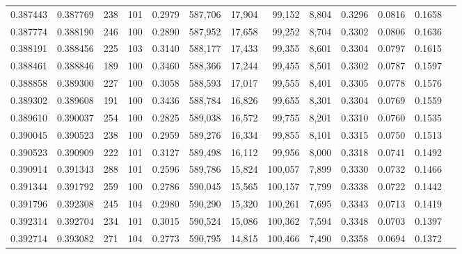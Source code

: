 \begin{tabular}{rrrrrrrrrrrrr}
0.387443 & 0.387769 &   238 & 101 &                                     0.2979 & 587,706 &  17,904 &  99,152 &   8,804 & 0.3296 & 0.0816 & 0.1658 \\
0.387774 & 0.388190 &   246 & 100 &                                     0.2890 & 587,952 &  17,658 &  99,252 &   8,704 & 0.3302 & 0.0806 & 0.1636 \\
0.388191 & 0.388456 &   225 & 103 &                                     0.3140 & 588,177 &  17,433 &  99,355 &   8,601 & 0.3304 & 0.0797 & 0.1615 \\
0.388461 & 0.388846 &   189 & 100 &                                     0.3460 & 588,366 &  17,244 &  99,455 &   8,501 & 0.3302 & 0.0787 & 0.1597 \\
0.388858 & 0.389300 &   227 & 100 &                                     0.3058 & 588,593 &  17,017 &  99,555 &   8,401 & 0.3305 & 0.0778 & 0.1576 \\
0.389302 & 0.389608 &   191 & 100 &                                     0.3436 & 588,784 &  16,826 &  99,655 &   8,301 & 0.3304 & 0.0769 & 0.1559 \\
0.389610 & 0.390037 &   254 & 100 &                                     0.2825 & 589,038 &  16,572 &  99,755 &   8,201 & 0.3310 & 0.0760 & 0.1535 \\
0.390045 & 0.390523 &   238 & 100 &                                     0.2959 & 589,276 &  16,334 &  99,855 &   8,101 & 0.3315 & 0.0750 & 0.1513 \\
0.390523 & 0.390909 &   222 & 101 &                                     0.3127 & 589,498 &  16,112 &  99,956 &   8,000 & 0.3318 & 0.0741 & 0.1492 \\
0.390914 & 0.391343 &   288 & 101 &                                     0.2596 & 589,786 &  15,824 & 100,057 &   7,899 & 0.3330 & 0.0732 & 0.1466 \\
0.391344 & 0.391792 &   259 & 100 &                                     0.2786 & 590,045 &  15,565 & 100,157 &   7,799 & 0.3338 & 0.0722 & 0.1442 \\
0.391796 & 0.392308 &   245 & 104 &                                     0.2980 & 590,290 &  15,320 & 100,261 &   7,695 & 0.3343 & 0.0713 & 0.1419 \\
0.392314 & 0.392704 &   234 & 101 &                                     0.3015 & 590,524 &  15,086 & 100,362 &   7,594 & 0.3348 & 0.0703 & 0.1397 \\
0.392714 & 0.393082 &   271 & 104 &                                     0.2773 & 590,795 &  14,815 & 100,466 &   7,490 & 0.3358 & 0.0694 & 0.1372 \\

\end{tabular}

